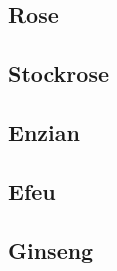 \subsection{Rose}

\subsection{Stockrose}

\subsection{Enzian}

\subsection{Efeu}

\subsection{Ginseng}